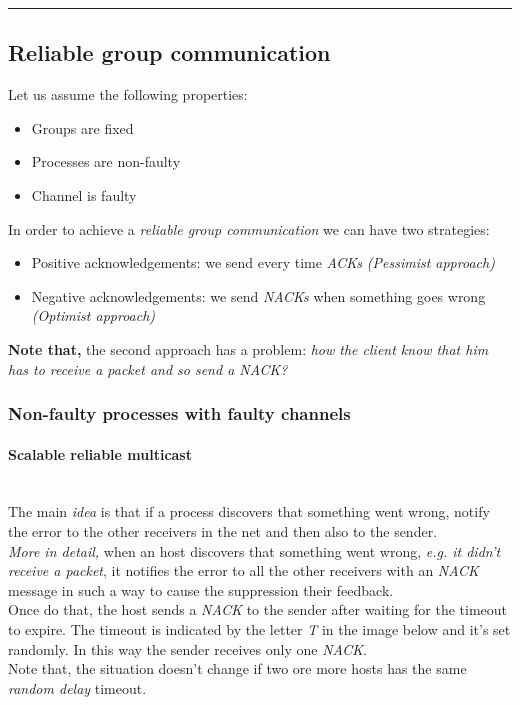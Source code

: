 \begin{center}\rule{3in}{0.4pt}\end{center}

\subsection{Reliable group
communication}\label{reliable-group-communication}
Let us assume the following properties:
\begin{itemize}
\itemsep1pt\parskip0pt
\item
  Groups are fixed
\item
  Processes are non-faulty
\item
  Channel is faulty
\end{itemize}

In order to achieve a \textit{reliable group communication} we can have two strategies:
\begin{itemize}
\itemsep1pt\parskip0pt
\item
  Positive acknowledgements: we send every time \textit{ACKs} \textit{(Pessimist
  approach)}
\item
  Negative acknowledgements: we send \textit{NACKs} when something goes wrong \textit{(Optimist approach)} 

\end{itemize}

\textbf{Note that,} the second approach has a problem: \textit{how the client know that him has to receive a packet and so send a NACK?}

\subsubsection{Non-faulty processes with faulty
channels}\label{non-faulty-processes-with-faulty-channels}

\paragraph{Scalable reliable multicast}\\
The main \textit{idea} is that if a process discovers that something went wrong, notify the error to the other receivers in the net and then also to the sender.\\
\textit{More in detail, }
when an host discovers that something went wrong, \textit{e.g. it didn't receive a packet}, it notifies the error to all the other receivers with an \textit{NACK} message in such a way to cause the suppression their feedback.\\
Once do that, the host sends a \textit{NACK} to the sender after waiting for the timeout to expire. The timeout is indicated by the letter \textit{T} in the image below and it's set randomly. In this way the sender receives only one \textit{NACK}.\\
Note that, the situation doesn't change if two ore more hosts has the same \textit{random delay} timeout.

